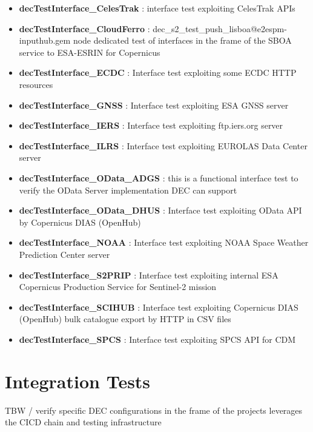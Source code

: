\documentclass[dec_sum_main.tex]{subfiles}
\begin{document}
\begin{itemize}
    \item \textbf{decTestInterface\_CelesTrak} : interface test exploiting CelesTrak APIs
     \item \textbf{decTestInterface\_CloudFerro} : dec\_s2\_test\_push\_lisboa@e2espm-inputhub.gem node dedicated test of interfaces in the frame of the SBOA service to ESA-ESRIN for Copernicus
     \item \textbf{decTestInterface\_ECDC} : Interface test exploiting some ECDC HTTP resources
     \item \textbf{decTestInterface\_GNSS} : Interface test exploiting ESA GNSS server
     \item \textbf{decTestInterface\_IERS} : Interface test exploiting ftp.iers.org  server
     \item \textbf{decTestInterface\_ILRS} : Interface test exploiting EUROLAS Data Center server
     \item \textbf{decTestInterface\_OData\_ADGS} : this is a functional interface test to verify the OData Server implementation DEC can support
     \item \textbf{decTestInterface\_OData\_DHUS} : Interface test exploiting OData API by Copernicus DIAS (OpenHub)
     \item \textbf{decTestInterface\_NOAA} : Interface test exploiting NOAA Space Weather Prediction Center server
     \item \textbf{decTestInterface\_S2PRIP} : Interface test exploiting internal ESA Copernicus Production Service for Sentinel-2 mission
     \item \textbf{decTestInterface\_SCIHUB} : Interface test exploiting Copernicus DIAS (OpenHub) bulk catalogue export by HTTP in CSV files
     \item \textbf{decTestInterface\_SPCS} : Interface test exploiting SPCS API for CDM     
\end{itemize}



\section{Integration Tests}
TBW / verify specific DEC configurations in the frame of the projects 
leverages the CICD chain and testing infrastructure
\end{document}
